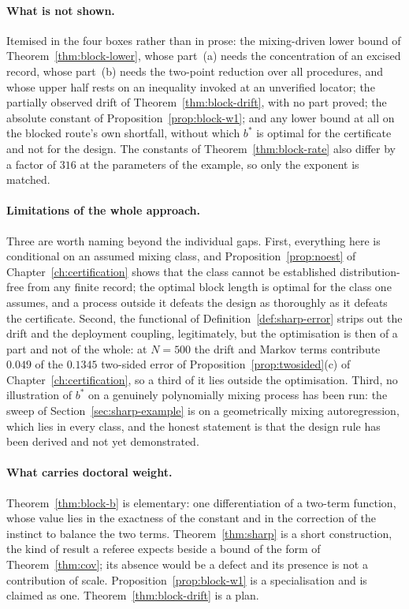 \documentclass[../../../main.tex]{subfiles}
\begin{document}
\paragraph{What is not shown.} Itemised in the four boxes rather than in prose: the mixing-driven lower bound of Theorem~\ref{thm:block-lower}, whose part~(a) needs the concentration of an excised record, whose part~(b) needs the two-point reduction over all procedures, and whose upper half rests on an inequality invoked at an unverified locator; the partially observed drift of Theorem~\ref{thm:block-drift}, with no part proved; the absolute constant of Proposition~\ref{prop:block-w1}; and any lower bound at all on the blocked route's own shortfall, without which $b^*$ is optimal for the certificate and not for the design. The constants of Theorem~\ref{thm:block-rate} also differ by a factor of $316$ at the parameters of the example, so only the exponent is matched.

\paragraph{Limitations of the whole approach.} Three are worth naming beyond the individual gaps. First, everything here is conditional on an assumed mixing class, and Proposition~\ref{prop:noest} of Chapter~\ref{ch:certification} shows that the class cannot be established distribution-free from any finite record; the optimal block length is optimal for the class one assumes, and a process outside it defeats the design as thoroughly as it defeats the certificate. Second, the functional of Definition~\ref{def:sharp-error} strips out the drift and the deployment coupling, legitimately, but the optimisation is then of a part and not of the whole: at $N=500$ the drift and Markov terms contribute $0.049$ of the $0.1345$ two-sided error of Proposition~\ref{prop:twosided}(c) of Chapter~\ref{ch:certification}, so a third of it lies outside the optimisation. Third, no illustration of $b^*$ on a genuinely polynomially mixing process has been run: the sweep of Section~\ref{sec:sharp-example} is on a geometrically mixing autoregression, which lies in every class, and the honest statement is that the design rule has been derived and not yet demonstrated.

\paragraph{What carries doctoral weight.} Theorem~\ref{thm:block-b} is elementary: one differentiation of a two-term function, whose value lies in the exactness of the constant and in the correction of the instinct to balance the two terms. Theorem~\ref{thm:sharp} is a short construction, the kind of result a referee expects beside a bound of the form of Theorem~\ref{thm:cov}; its absence would be a defect and its presence is not a contribution of scale. Proposition~\ref{prop:block-w1} is a specialisation and is claimed as one. Theorem~\ref{thm:block-drift} is a plan.
\end{document}
